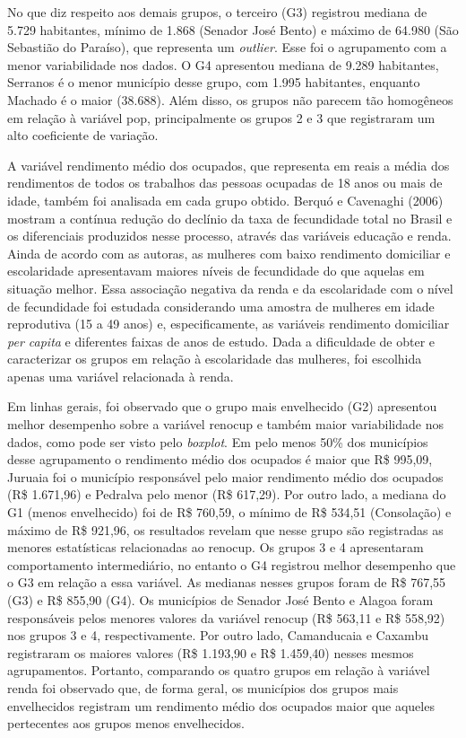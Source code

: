 \documentclass[10pt,twoside]{article}
\begin{document}
No que diz respeito aos demais grupos, o terceiro (G3) registrou mediana de 5.729 habitantes, mínimo de 1.868 (Senador José Bento) e máximo de 64.980 (São Sebastião do Paraíso), que representa um \textit{outlier}. Esse foi o agrupamento com a menor variabilidade nos dados. O G4 apresentou mediana de 9.289 habitantes, Serranos é o menor município desse grupo, com 1.995 habitantes, enquanto Machado é o maior (38.688). Além disso, os grupos não parecem tão homogêneos em relação à variável pop, principalmente os grupos 2 e 3 que registraram um alto coeficiente de variação.

A variável rendimento médio dos ocupados, que representa em reais a média dos rendimentos de todos os trabalhos das pessoas ocupadas de 18 anos ou mais de idade, também foi analisada em cada grupo obtido. Berquó e Cavenaghi (2006) mostram a contínua redução do declínio da taxa de fecundidade total no Brasil e os diferenciais produzidos nesse processo, através das variáveis educação e renda. Ainda de acordo com as autoras, as mulheres com baixo rendimento domiciliar e escolaridade apresentavam maiores níveis de fecundidade do que aquelas em situação melhor. Essa associação negativa da renda e da escolaridade com o nível de fecundidade foi estudada considerando uma amostra de mulheres em idade reprodutiva (15 a 49 anos) e, especificamente, as variáveis rendimento domiciliar \textit{per capita} e diferentes faixas de anos de estudo. Dada a dificuldade de obter e caracterizar os grupos em relação à escolaridade das mulheres, foi escolhida apenas uma variável relacionada à renda.

Em linhas gerais, foi observado que o grupo mais envelhecido (G2) apresentou melhor desempenho sobre a variável renocup e também maior variabilidade nos dados, como pode ser visto pelo \textit{boxplot}. Em pelo menos 50\% dos municípios desse agrupamento o rendimento médio dos ocupados é maior que R\$ 995,09, Juruaia foi o município responsável pelo maior rendimento médio dos ocupados (R\$ 1.671,96) e Pedralva pelo menor (R\$ 617,29). Por outro lado, a mediana do G1 (menos envelhecido) foi de R\$ 760,59, o mínimo de R\$ 534,51 (Consolação) e máximo de R\$ 921,96, os resultados revelam que nesse grupo são registradas as menores estatísticas relacionadas ao renocup. Os grupos 3 e 4 apresentaram comportamento intermediário, no entanto o G4 registrou melhor desempenho que o G3 em relação a essa variável. As medianas nesses grupos foram de R\$ 767,55 (G3) e R\$ 855,90 (G4). Os municípios de Senador José Bento e Alagoa foram responsáveis pelos menores valores da variável renocup (R\$ 563,11 e R\$ 558,92) nos grupos 3 e 4, respectivamente. Por outro lado, Camanducaia e Caxambu registraram os maiores valores (R\$ 1.193,90 e R\$ 1.459,40) nesses mesmos agrupamentos. Portanto, comparando os quatro grupos em relação à variável renda foi observado que, de forma geral, os municípios dos grupos mais envelhecidos registram um rendimento médio dos ocupados maior que aqueles pertecentes aos grupos menos envelhecidos.
\end{document}
